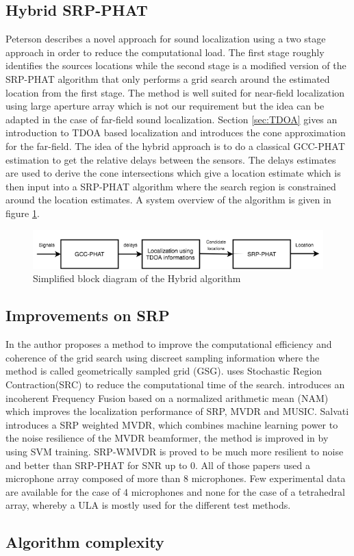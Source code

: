 
\subsection{Hybrid SRP-PHAT}

Peterson \cite{peterson2005hybrid} describes a novel approach for sound localization using a two stage approach in order to reduce the computational load. The first stage roughly identifies the sources locations while the second stage is a modified version of the SRP-PHAT algorithm that only performs a grid search around the estimated location from the first stage.  The method is well suited for near-field localization using large aperture array which is not our requirement but the idea can be adapted in the case of far-field sound localization. Section \ref{sec:TDOA} gives an introduction to TDOA based localization and introduces the cone approximation for the far-field. The idea of the hybrid approach is to do a classical GCC-PHAT estimation to get the relative delays between the sensors. The delays estimates are used to derive the cone intersections which give a location estimate which is then input into a SRP-PHAT algorithm where the search region is constrained around the location estimates. A system overview of the algorithm is given in figure \ref{fig:hybridalgo}.

\begin{figure}[H]
    \centering
    \includegraphics[width=1\textwidth]{Figures/hybridalgo.png}
    \caption{Simplified block diagram of the Hybrid algorithm}
    \label{fig:hybridalgo}
\end{figure}

\subsection{Improvements on SRP}

In \cite{salvati2017exploiting} the author proposes a method to improve the computational efficiency and coherence of the grid search using discreet sampling information where the method is called geometrically sampled grid (GSG). \cite{do2007real} uses Stochastic Region Contraction(SRC) to reduce the computational time of the search. \cite{salvati2014incoherent} introduces an incoherent Frequency Fusion based on a normalized arithmetic mean (NAM) which improves the localization performance of SRP, MVDR and MUSIC. Salvati \cite{salvati2015frequency} introduces a SRP weighted MVDR, which combines machine learning power to the noise resilience of the MVDR beamformer, the method is improved in \cite{salvati2016use} by using SVM training. SRP-WMVDR is proved to be much more resilient to noise and better than SRP-PHAT for SNR up to 0. All of those papers used a microphone array composed of more than 8 microphones. Few experimental data are available for the case of 4 microphones and none for the case of a tetrahedral array, whereby a ULA is mostly used for the different test methods.

\subsection{Algorithm complexity}

